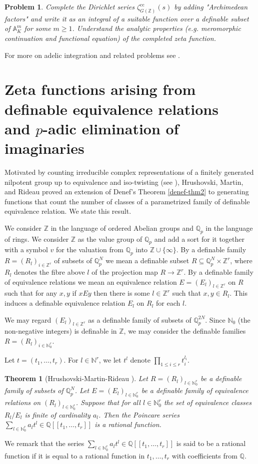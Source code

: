 \documentclass[12pt]{amsart}
\def\A{\mathbb{A}}
\def\N{\mathbb{N}}
\def\Z{\mathbb{Z}}
\def\Q{\mathbb{Q}}
\newtheorem{thm}{Theorem}[section]
\numberwithin{equation}{section}
\newtheorem{prob}{Problem}[section]
\begin{document}
\begin{prob}\label{conj-zeta} Complete the Dirichlet series $\zeta_{G(\Z)}^{\mathrm{cc}}(s)$ by adding "Archimedean factors" and write it as an integral of a suitable function over a definable subset of $\A_K^m$ for some $m\geq 1$. 
Understand the analytic properties (e.g. meromorphic continuation and functional equation) of the completed zeta function.
\end{prob}
For more on adelic integration and related problems see \cite{adeles-surv}.

\section{\bf Zeta functions arising from definable equivalence relations\\ and $p$-adic elimination of imaginaries}

Motivated by counting irreducible complex representations of a finitely generated nilpotent group up to equivalence and iso-twisting (see \cite{HMR}), 
Hrushovski, Martin, and Rideau \cite{HMR} proved an extension of Denef's Theorem \ref{denef-thm2} to generating functions that count the number of  classes of a parametrized family of definable equivalence relation. We state this result.

We consider $\Z$ in the language of ordered Abelian groups and $\Q_p$ in the language of rings. We consider $\Z$ as the value group of $\Q_p$ and add a sort for it together with a symbol $v$ for the valuation from $\Q_p$ into $\Z\cup \{\infty\}$.  By a definable family $R=(R_l)_{i\in \Z^r}$ of subsets of $\Q_p^N$ we mean a definable subset 
$R\subseteq \Q_p^N \times \Z^r$, where $R_l$ denotes the fibre above $l$ of the projection map $R\rightarrow \Z^r$. 
By a definable family of equivalence relations we mean an equivalence relation $E=(E_l)_{l\in \Z^r}$ on $R$ such that 
for any $x,y$ if $xEy$ then there is some $l\in \Z^r$ such that $x,y \in R_l$. This induces a definable equivalence relation 
$E_l$ on $R_l$ for each $l$. 

We may regard $(E_l)_{l\in \Z^r}$ as a definable family of subsets of $\Q_p^{2N}$. Since $\N_0$ (the non-negative integers) is definable in $\Z$, we may consider the definable families $R=(R_l)_{i\in \N_0^r}$. 

Let $t=(t_1,\dots,t_r)$. For $l\in \N^r$, we let $t^l$ denote $\prod_{1\leq i \leq r} t_i^{l_i}$. 

\begin{thm}[Hrushovski-Martin-Rideau \cite{HMR}]\label{HMR} Let $R=(R_l)_{l\in \N_0^r}$ be a definable family of subsets of $\Q_p^N$. Let $E=(E_l)_{l\in \N_0^r}$ be a definable family of equivalence relations on $(R_l)_{l\in \N_0^r}$. Suppose that for all $l\in \N_0^r$ the set of equivalence classes $R_l/E_l$ is finite of cardinality $a_l$. Then the Poincare series $\sum_{l\in \N_0^r}a_l t^l \in \Q[[t_1,\dots,t_r]]$ is a rational function.\end{thm}
We remark that the series $\sum_{l\in \N_0^r}a_l t^l \in \Q[[t_1,\dots,t_r]]$ is said to be a rational function if it is 
equal to a rational function in $t_1,\dots,t_r$ with coefficients from $\Q$.
\end{document}
